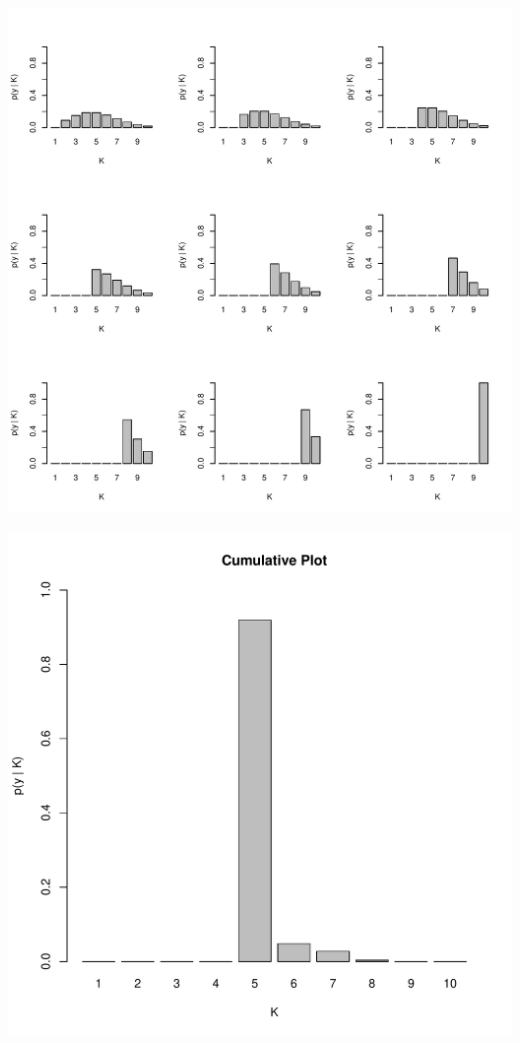 \documentclass[12pt,letterpaper]{article}\usepackage[]{graphicx}\usepackage[]{color}
\makeatletter
\def\maxwidth{ %
  \ifdim\Gin@nat@width>\linewidth
    \linewidth
  \else
    \Gin@nat@width
  \fi
}
\newenvironment{knitrout}{}{} %
\makeatother
\begin{document}
\begin{knitrout}
\color{fgcolor}
\includegraphics[width=\maxwidth]{figure/unnamed-chunk-1-1} 

\includegraphics[width=\maxwidth]{figure/unnamed-chunk-1-2} 

\end{knitrout}
\end{document}

